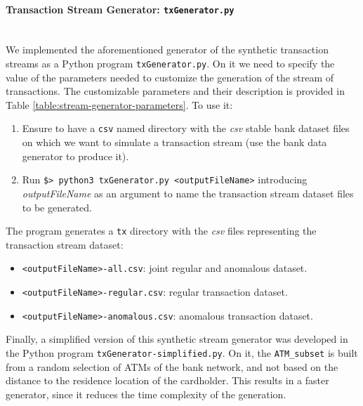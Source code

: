 \paragraph{Transaction Stream Generator: \texttt{txGenerator.py}\\\\}

We implemented the aforementioned generator of the synthetic transaction streams as a Python program
\texttt{txGenerator.py}. On it we need to specify the value of the parameters needed to customize the generation of the stream of transactions. 
The customizable parameters and their description is provided in Table \ref{table:stream-generator-parameters}. To use it:

\begin{enumerate}
    \item Ensure to have a \texttt{csv} named directory with the \emph{csv} stable bank dataset files on which we want to simulate a transaction stream (use the bank data generator to produce it).
    \item Run \texttt{\$> python3 txGenerator.py <outputFileName>} introducing \emph{outputFileName} as an argument to name the transaction stream dataset files to be generated.
\end{enumerate}

The program generates a \texttt{tx} directory with the \emph{csv} files representing the transaction stream dataset:

\begin{itemize}
    \item \texttt{<outputFileName>-all.csv}: joint regular and anomalous dataset.
    \item \texttt{<outputFileName>-regular.csv}: regular transaction dataset.
    \item \texttt{<outputFileName>-anomalous.csv}: anomalous transaction dataset.
\end{itemize}

Finally, a simplified version of this synthetic stream generator was developed in the Python program \texttt{txGenerator-simplified.py}. On it, the \texttt{ATM\_subset} is built from a random selection of ATMs of the bank network, and not based on the distance to the residence location of the cardholder. This results in a faster generator, since it reduces the time complexity of the generation.

